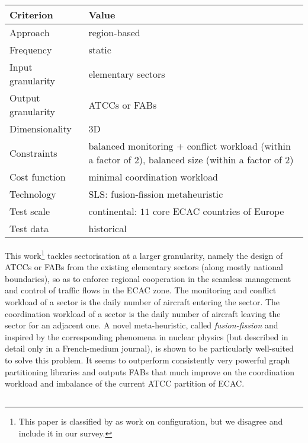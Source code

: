 \documentclass[a4paper,12pt]{article}
\begin{document}
\begin{center}
\begin{tabular}{|l|l|}
  \hline
  Criterion & Value \\
  \hline\hline
  Approach & region-based \\ \hline
  Frequency & static \\ \hline
  Input granularity & elementary sectors \\ \hline
  Output granularity & ATCCs or FABs \\ \hline
  Dimensionality & 3D \\ \hline
  Constraints & \parbox{11.5cm}{balanced monitoring + conflict
    workload (within a factor of $2$), balanced size (within a
    factor of $2$)} \\ \hline
  Cost function & minimal coordination workload \\ \hline
  Technology & SLS: fusion-fission metaheuristic \\ \hline
  Test scale & continental: $11$ core ECAC countries of Europe \\ \hline
  Test data & historical \\ \hline
\end{tabular}
\end{center}
This work\footnote{This paper is classified by \cite{Zelinski:DASC11}
  as work on configuration, but we disagree and include it in our
  survey.} tackles sectorisation at a larger granularity, namely the
design of ATCCs or FABs from the existing elementary sectors (along
mostly national boundaries), so as to enforce regional cooperation in
the seamless management and control of traffic flows in the ECAC zone.
The monitoring and conflict workload of a sector is the daily number
of aircraft entering the sector.  The coordination workload of a
sector is the daily number of aircraft leaving the sector for an
adjacent one.  A novel meta-heuristic, called \emph{fusion-fission}
and inspired by the corresponding phenomena in nuclear physics (but
described in detail only in a French-medium journal), is shown to be
particularly well-suited to solve this problem.  It seems to
outperform consistently very powerful graph partitioning libraries and
outputs FABs that much improve on the coordination workload and
imbalance of the current ATCC partition of ECAC.

\subsection{\cite{Conker:ATM07}}
\end{document}
